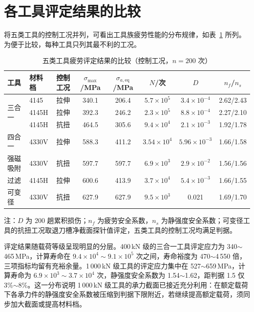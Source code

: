 \section{各工具评定结果的比较}
\label{sec:fatigue-compare}

将五类工具的控制工况并列，可看出工具族疲劳性能的分布规律，如表~\ref{tab:fatigue-compare} 所列。为便于比较，每种工具只列其最不利的工况。

\begin{table}[htbp]
\centering
\caption{五类工具疲劳评定结果的比较（控制工况，$n=200$ 次）}
\label{tab:fatigue-compare}
\small
\setlength{\tabcolsep}{4pt}
\begin{tabular}{@{}llcccccc@{}}
\hline
工具 & 材料档 & 控制工况 & $\sigma_{\max}$/MPa & $\sigma_{a,\mathrm{eq}}$/MPa & $N$/次 & $D$ & $n_f$/$n_s$ \\
\hline
\multirow{3}{*}{三合一} & 4145 & 拉伸 & 340.1 & 206.4 & $5.7\times10^{5}$ & $3.4\times10^{-4}$ & 2.62/2.43 \\
 & 4145H & 拉伸 & 392.3 & 246.2 & $2.3\times10^{5}$ & $8.8\times10^{-4}$ & 2.27/2.10 \\
 & 4145H & 抗扭 & 464.5 & 305.6 & $9.4\times10^{4}$ & $2.1\times10^{-3}$ & 1.92/1.78 \\
四合一 & 4330V & 拉伸 & 588.3 & 411.2 & $3.54\times10^{4}$ & $5.96\times10^{-3}$ & 1.66/1.58 \\
强磁吸附 & 4330V & 抗扭 & 597.7 & 597.7 & $6.9\times10^{3}$ & $2.9\times10^{-2}$ & 1.56/1.56 \\
过滤 & 4145H & 拉伸 & 600.6 & 413.9 & $3.7\times10^{4}$ & $5.4\times10^{-3}$ & 1.66/1.55 \\
可变径 & 4330V & 抗扭 & 627.9 & 627.9 & $9.5\times10^{3}$ & 0.021 & 1.69/1.70 \\
\hline
\end{tabular}

\vspace{2pt}
{\footnotesize 注：$D$ 为 200 趟累积损伤；$n_f$ 为疲劳安全系数，$n_s$ 为静强度安全系数；可变径工具的抗扭工况取退刀槽净截面探针值评定，五类工具的控制工况均满足判据。}
\end{table}

评定结果随载荷等级呈现明显的分层。400\,kN 级的三合一工具评定应力为 340$\sim$465\,MPa，计算寿命在 $9.4\times10^{4}\sim9.1\times10^{5}$ 次之间，寿命裕度为 470$\sim$4\,550 倍，三项指标均留有充裕余量。1\,000\,kN 级工具的评定应力集中在 527$\sim$659\,MPa，计算寿命为 $6.9\times10^{3}\sim3.7\times10^{4}$ 次，静强度安全系数为 1.54$\sim$1.62，距判据 1.5 仅 3\%$\sim$8\%。这一分布说明 1\,000\,kN 级工具的承力截面已接近充分利用：在额定载荷下各承力件的静强度安全系数被压缩到判据下限附近，若继续提高额定载荷，须同步加大截面或提高材料档。

